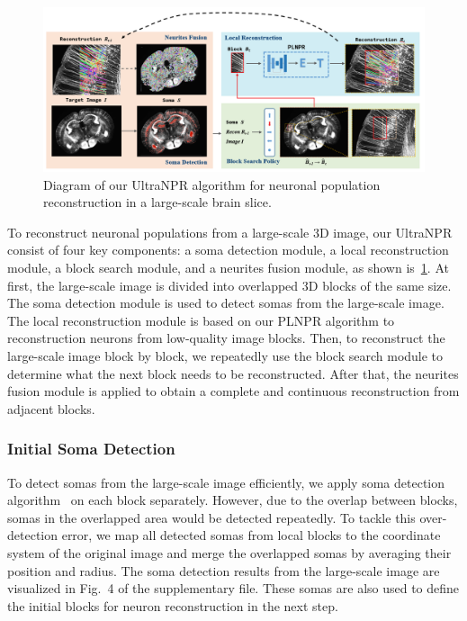\begin{figure}[th]
	\centering
	\includegraphics[width=1\textwidth]{./Illustrations/framework_ultranpr.PNG}
	\caption{Diagram of our UltraNPR algorithm for neuronal population reconstruction in a large-scale brain slice.}
	\label{fig:ultra_framework}
\end{figure}

To reconstruct neuronal populations from a large-scale 3D image, our UltraNPR consist of four key components: a soma detection module, a local reconstruction module, a block search module, and a neurites fusion module, as shown is~\ref{fig:ultra_framework}.
At first,  the large-scale image is divided into overlapped 3D blocks of the same size. 
The soma detection module is used to detect somas from the large-scale image.
The local reconstruction module is based on our PLNPR algorithm to reconstruction neurons from low-quality image blocks. 
Then, to reconstruct the large-scale image block by block,  we repeatedly use the block search module to determine what the next block needs to be reconstructed. 
After that, the neurites fusion module is applied to obtain a complete and continuous reconstruction from adjacent blocks.

\subsubsection{Initial Soma Detection}
\label{sec:soma}

To detect somas from the large-scale image efficiently, we apply soma detection algorithm~\cite{Quan2013} on each block separately.
However, due to the overlap between blocks, somas in the overlapped area would be detected repeatedly.
To tackle this over-detection error, we map all detected somas from local blocks to the coordinate system of the original image and merge the overlapped somas by averaging their position and radius.
The soma detection results from the large-scale image are visualized in Fig.~{4} of the supplementary file.
These somas are also used to define the initial blocks for neuron reconstruction in the next step.


